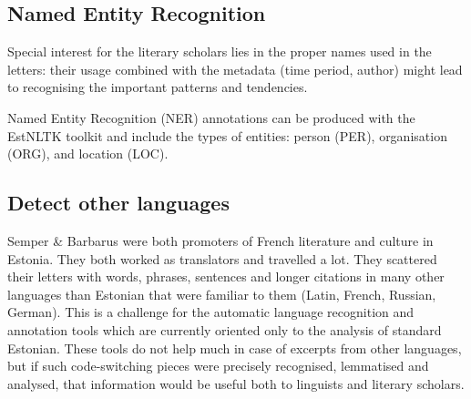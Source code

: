 \documentclass[runningheads]{llncs}
\begin{document}
\subsection{Named Entity Recognition}

Special interest for the literary scholars lies in the proper names used in the letters: their usage combined with the metadata (time period, author) might lead to recognising the important patterns and tendencies. 

Named Entity Recognition (NER) annotations can be produced with the EstNLTK toolkit and include the types of entities: person (PER), organisation (ORG), and location (LOC). %

\subsection{Detect other languages}

Semper \& Barbarus were both promoters of French literature and culture in Estonia. They both worked as translators and travelled a lot. They scattered their letters with words, phrases, sentences and longer citations in many other languages than Estonian that were familiar to them (Latin, French, Russian, German). This is a challenge for the automatic language recognition and annotation tools which are currently oriented only to the analysis of standard Estonian. These tools do not help much in case of excerpts from other languages, but if such code-switching pieces were precisely recognised, lemmatised and analysed, that information would be useful both to linguists and literary scholars.
\end{document}
